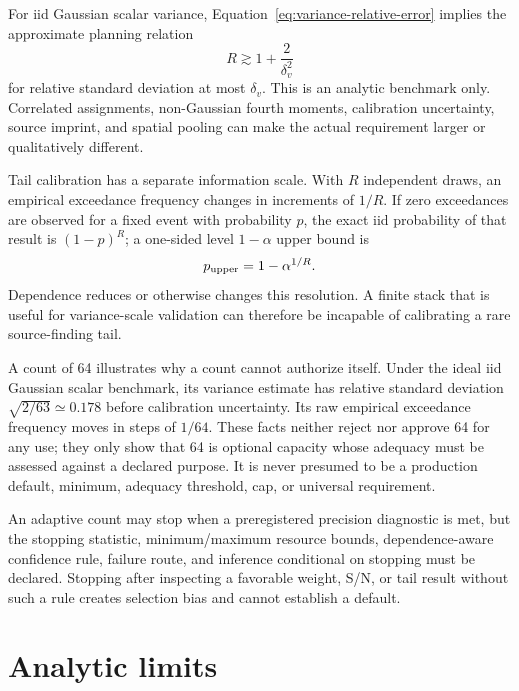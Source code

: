 \documentclass[11pt]{article}
\begin{document}
For iid Gaussian scalar variance, Equation~\eqref{eq:variance-relative-error}
implies the approximate planning relation
\begin{equation}
  R\gtrsim1+\frac{2}{\delta_v^2}
  \label{eq:variance-count-planning}
\end{equation}
for relative standard deviation at most $\delta_v$.  This is an analytic
benchmark only.  Correlated assignments, non-Gaussian fourth moments,
calibration uncertainty, source imprint, and spatial pooling can make the
actual requirement larger or qualitatively different.

Tail calibration has a separate information scale.  With $R$ independent
draws, an empirical exceedance frequency changes in increments of $1/R$.
If zero exceedances are observed for a fixed event with probability $p$, the
exact iid probability of that result is $(1-p)^R$; a one-sided level
$1-\alpha$ upper bound is
\begin{equation}
  p_{\rm upper}=1-\alpha^{1/R}.
  \label{eq:zero-exceedance-bound}
\end{equation}
Dependence reduces or otherwise changes this resolution.  A finite stack that
is useful for variance-scale validation can therefore be incapable of
calibrating a rare source-finding tail.

A count of 64 illustrates why a count cannot authorize itself.  Under the
ideal iid Gaussian scalar benchmark, its variance estimate has relative
standard deviation $\sqrt{2/63}\simeq0.178$ before calibration uncertainty.
Its raw empirical exceedance frequency moves in steps of $1/64$.  These facts
neither reject nor approve 64 for any use; they only show that 64 is optional
capacity whose adequacy must be assessed against a declared purpose.  It is
never presumed to be a production default, minimum, adequacy threshold, cap,
or universal requirement.

An adaptive count may stop when a preregistered precision diagnostic is met,
but the stopping statistic, minimum/maximum resource bounds, dependence-aware
confidence rule, failure route, and inference conditional on stopping must be
declared.  Stopping after inspecting a favorable weight, S/N, or tail result
without such a rule creates selection bias and cannot establish a default.

\section{Analytic limits}
\end{document}
